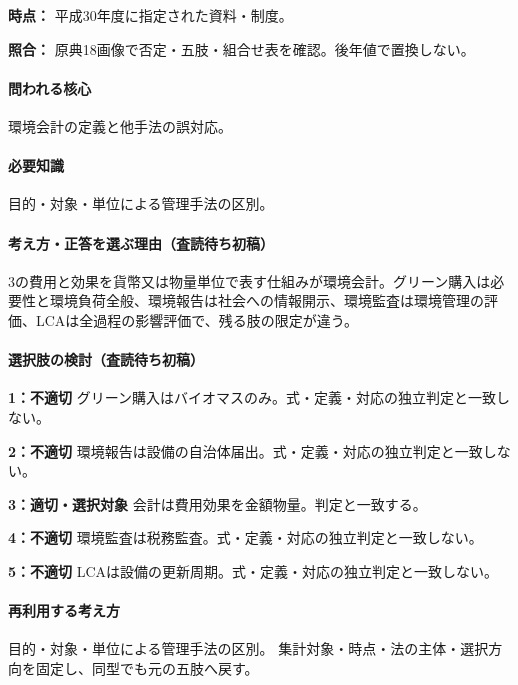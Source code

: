 \noindent\textbf{時点：} 平成30年度に指定された資料・制度。\par

\noindent\textbf{照合：} 原典18画像で否定・五肢・組合せ表を確認。後年値で置換しない。\par

\paragraph{問われる核心} 環境会計の定義と他手法の誤対応。

\paragraph{必要知識} 目的・対象・単位による管理手法の区別。

\paragraph{考え方・正答を選ぶ理由（査読待ち初稿）} 3の費用と効果を貨幣又は物量単位で表す仕組みが環境会計。グリーン購入は必要性と環境負荷全般、環境報告は社会への情報開示、環境監査は環境管理の評価、LCAは全過程の影響評価で、残る肢の限定が違う。

\paragraph{選択肢の検討（査読待ち初稿）}\mbox{}\par

\noindent\textbf{1：不適切} グリーン購入はバイオマスのみ。式・定義・対応の独立判定と一致しない。\par

\noindent\textbf{2：不適切} 環境報告は設備の自治体届出。式・定義・対応の独立判定と一致しない。\par

\noindent\textbf{3：適切・選択対象} 会計は費用効果を金額物量。判定と一致する。\par

\noindent\textbf{4：不適切} 環境監査は税務監査。式・定義・対応の独立判定と一致しない。\par

\noindent\textbf{5：不適切} LCAは設備の更新周期。式・定義・対応の独立判定と一致しない。\par

\paragraph{再利用する考え方} 目的・対象・単位による管理手法の区別。 集計対象・時点・法の主体・選択方向を固定し、同型でも元の五肢へ戻す。

